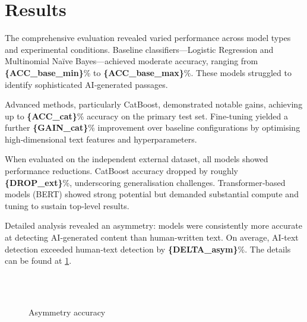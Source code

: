 \section{Results}  %

The comprehensive evaluation revealed varied performance across model
types and experimental conditions. Baseline classifiers---Logistic
Regression and Multinomial Naïve Bayes---achieved moderate accuracy,
ranging from \textbf{\{ACC\_base\_min\}}\% to
\textbf{\{ACC\_base\_max\}}\%. These models struggled to identify
sophisticated AI‐generated passages.

Advanced methods, particularly CatBoost, demonstrated notable gains,
achieving up to \textbf{\{ACC\_cat\}}\% accuracy on the primary test
set. Fine‐tuning yielded a further \textbf{\{GAIN\_cat\}}\% improvement
over baseline configurations by optimising high‐dimensional text
features and hyperparameters.

When evaluated on the independent external dataset, all models showed
performance reductions. CatBoost accuracy dropped by roughly
\textbf{\{DROP\_ext\}}\%, underscoring generalisation challenges.
Transformer‐based models (BERT) showed strong potential but demanded
substantial compute and tuning to sustain top‐level results.

Detailed analysis revealed an asymmetry: models were consistently more
accurate at detecting AI‐generated content than human‐written text. On
average, AI‐text detection exceeded human‐text detection by
\textbf{\{DELTA\_asym\}}\%. The details can be found at \cref{fig:asymmetry}.

\begin{figure}[h!]
  \centering

  \\
  \\
  \caption{Asymmetry accuracy}
  \label{fig:asymmetry}
\end{figure}

